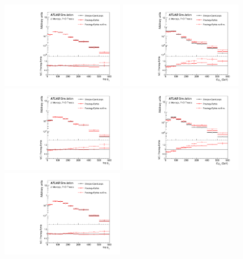 \begin{figure}[!tp]
\begin{center}
  \includegraphics[width=0.46\textwidth]{Modeling/Figures/norw_tt1bq_top_pt_norm}
  \includegraphics[width=0.46\textwidth]{Modeling/Figures/norw_tt1bq_ttbar_pt_norm}
  \includegraphics[width=0.46\textwidth]{Modeling/Figures/norw_tt1gbbq_top_pt_norm}
  \includegraphics[width=0.46\textwidth]{Modeling/Figures/norw_tt1gbbq_ttbar_pt_norm}
  \includegraphics[width=0.46\textwidth]{Modeling/Figures/norw_tt2bq_top_pt_norm}

\end{center}
\end{figure}
